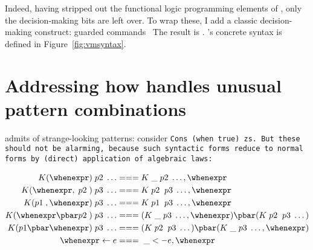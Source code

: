 \documentclass[manuscript,screen,review, 12pt, nonacm]{acmart}
\begin{document}









Indeed, having stripped out the functional logic programming elements of
\VC, only the decision-making bits are left over. To wrap these, I add a
classic decision-making construct: guarded commands~\citep{dijkstra} The result is \VMinus. \VMinus's concrete syntax is
defined in Figure~\ref{fig:vmsyntax}. 

\section{Addressing how \PPlus handles unusual pattern combinations}
\label{ppweird}
    \PPlus admits of strange-looking patterns: consider \tt{Cons (when true)
    zs}. But these should not be alarming, because such syntactic forms reduce
    to normal forms by (direct) application of algebraic laws: 

    \begin{align}
      K (\whenexpr) \;p2\; \dots &=== K \;\_ \;p2\; \dots, \whenexpr \\
      K (\whenexpr, \;p2\;) \;p3\; \dots  &=== K \;p2\; \;p3\; \dots, \whenexpr \\
      K (p1\;, \whenexpr) \;p3\; \dots  &=== K \;p1\; \;p3\; \dots, \whenexpr \\
      K (\whenexpr \pbar p2\;) \;p3\; \dots &=== (K \;\_ \;p3\; \dots, \whenexpr) \pbar (K \;p2\; \;p3\; \dots) \\
      K (p1 \pbar \whenexpr) \;p3\; \dots &=== (K \;p2\; \;p3\; \dots) \pbar (K \;\_ \;p3\; \dots, \whenexpr)  \\
      \whenexpr \leftarrow e &=== \;\_ <- e, \whenexpr
    \end{align}   
    
\end{document}
